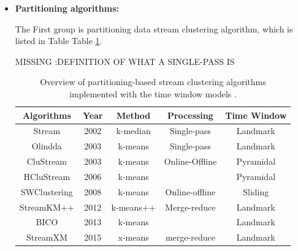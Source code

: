 \documentclass[../UNBThesis2.tex]{subfiles}
\begin{document}
\begin{itemize}
    \item\textbf{Partitioning algorithms:}


The First group is partitioning data stream clustering algorithm, which is listed in Table Table \ref{landmarkwin}. 

MISSING :DEFINITION OF WHAT A SINGLE-PASS IS

\begin{table}[h]
    \centering
    \caption{Overview of partitioning-based stream clustering algorithms implemented with the time window models \protect\cite{carnein2019optimizing, mansalis2018evaluation}. }
    \label{landmarkwin}
    \small
    \begin{tabular}{c c c c c}
    \hline
      \textbf{Algorithms} & \textbf{Year} & \textbf{ Method } & \textbf{Processing} & \textbf{ Time Window}  \\
     \hline \midrule

      Stream             &   2002        &   k-median        &  Single-pass      & Landmark \\
     \hline
     Olindda          &   2003        &   k-means         &   Single-pass     & Landmark \\
    \hline
     CluStream            &   2003        &  k-means       &  Online-Offline      & Pyramidal \\
    \hline   
     HCluStream           &    2006        &    k-means     &      & Pyramidal\\
    \hline    
     SWClustering       &    2008        &    k-means     &    Online-offline    & Sliding\\
       \hline
      StreamKM++       &    2012       &   k-means++ & Merge-reduce  & Landmark \\
    \hline 
      BICO               &    2013        &    k-means     &                     & Landmark\\
    \hline
     StreamXM            &   2015        &  x-means         &  merge-reduce      & Landmark \\
    \hline
\bottomrule
    \end{tabular}
\end{table}




\end{itemize}
\end{document}
